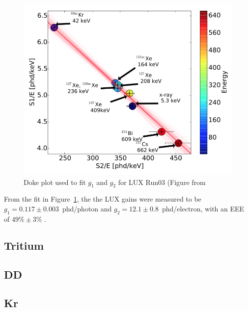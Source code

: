 \begin{figure}[htbp]
\begin{center}
\includegraphics[width=\halffig]{figures/lux/doke.png}
\caption{ Doke plot used to fit $g_{1}$ and $g_{2}$ for LUX Run03 (Figure from \cite{LUX:Run03Comprehensive}}
\label{fig:doke}
\end{center}
\end{figure}


From the fit in Figure~\ref{fig:doke}, the the \ac{LUX} gains were measured to be $g_{1} = 0.117 \pm 0.003$~phd/photon and $g_{2} = 12.1 \pm 0.8$~phd/electron, with an \ac{EEE} of $49\% \pm 3\%$ \cite{LUX:Run03Comprehensive}.

\subsection{Tritium}
\subsection{DD}
\subsection{Kr}





